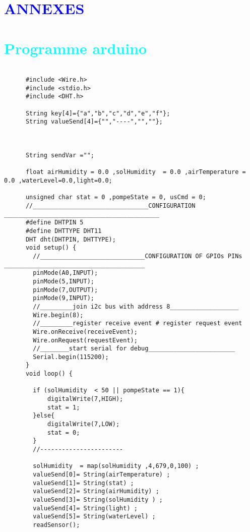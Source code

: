

\section*{\textcolor{blue}{ANNEXES}}

\section*{\textcolor{cyan}{Programme arduino}}

\begin{flushleft}
	\begin{lstlisting}[style=CStyle]
	
	  #include <Wire.h>
	  #include <stdio.h>
	  #include <DHT.h>
	  
	  String key[4]={"a","b","c","d","e","f"};
	  String valueSend[4]={"","----","",""};
	  
	  
	  
	  String sendVar ="";
	  
	  float airHumidity = 0.0 ,solHumidity  = 0.0 ,airTemperature = 0.0 ,waterLevel=0.0,light=0.0;
	  
	  unsigned char stat = 0 ,pompeState = 0, usCmd = 0;
	  //________________________________CONFIGURATION ___________________________________________
	  #define DHTPIN 5            
	  #define DHTTYPE DHT11       
	  DHT dht(DHTPIN, DHTTYPE);
	  void setup() {
	  	//_____________________________CONFIGURATION OF GPIOs PINs _______________________________________
	  	pinMode(A0,INPUT);
	  	pinMode(5,INPUT);
	  	pinMode(7,OUTPUT);
	  	pinMode(9,INPUT);
	  	//_________join i2c bus with address 8___________________
	  	Wire.begin(8);
	  	//_________register receive event # register request event               
	  	Wire.onReceive(receiveEvent); 
	  	Wire.onRequest(requestEvent);
	  	//________start serial for debug________________________ 
	  	Serial.begin(115200);          
	  }
	  void loop() {
	  	
	  	if (solHumidity  < 50 || pompeState == 1){
	  		digitalWrite(7,HIGH);
	  		stat = 1;
	  	}else{
	  		digitalWrite(7,LOW);
	  		stat = 0;
	  	}
	  	//-----------------------
	  	
	  	solHumidity  = map(solHumidity ,4,679,0,100) ; 
	  	valueSend[0]= String(airTemperature) ;
	  	valueSend[1]= String(stat) ;
	  	valueSend[2]= String(airHumidity) ;
	  	valueSend[3]= String(solHumidity ) ;
	  	valueSend[4]= String(light) ;
	  	valueSend[5]= String(waterLevel) ;
	  	readSensor();
	  	

\end{lstlisting}
\end{flushleft}
